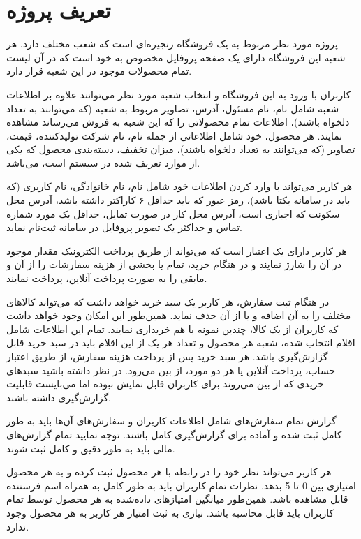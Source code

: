 \documentclass[12pt,a4paper]{article}
\begin{document}
\section{تعریف پروژه}
پروژه مورد نظر مربوط به یک فروشگاه زنجیره‌ای است که شعب مختلف دارد.
هر شعبه این فروشگاه دارای یک صفحه پروفایل مخصوص به خود است که در آن لیست تمام محصولات موجود در این شعبه قرار دارد. 
\par
کاربران با ورود به این فروشگاه و انتخاب شعبه مورد نظر می‌توانند
علاوه بر اطلاعات شعبه شامل نام، نام مسئول، آدرس، تصاویر مربوط به شعبه (که می‌توانند به تعداد دلخواه باشند)،
اطلاعات تمام محصولاتی را که این شعبه به فروش می‌رساند مشاهده نمایند.
هر محصول، خود شامل اطلاعاتی از جمله نام، نام شرکت تولیدکننده، قیمت، تصاویر (که می‌توانند به تعداد دلخواه باشند)،
میزان تخفیف، دسته‌بندی محصول که یکی از موارد تعریف شده در سیستم است، می‌باشد.
\par
هر کاربر می‌تواند با وارد کردن اطلاعات خود شامل نام،‌ نام خانوادگی، نام کاربری (که باید در سامانه یکتا باشد)،
رمز عبور که باید حداقل ۶ کاراکتر داشته باشد، آدرس محل سکونت که اجباری است،
آدرس محل کار در صورت تمایل، حداقل یک مورد شماره تماس و حداکثر یک تصویر پروفایل در سامانه ثبت‌نام نماید. 
\par
هر کاربر دارای یک اعتبار است که می‌تواند از طریق پرداخت الکترونیک مقدار موجود در آن را شارژ نمایند
و در هنگام خرید، تمام یا بخشی از هزینه سفارشات را از آن و مابقی را به صورت پرداخت آنلاین، پرداخت نمایند.
\par
در هنگام ثبت سفارش، هر کاربر یک سبد خرید خواهد داشت که می‌تواند کالاهای مختلف را به آن اضافه و یا از آن حذف نماید.
همین‌طور این امکان وجود خواهد داشت که کاربران از یک کالا، چندین نمونه با هم خریداری نمایند.
تمام این اطلاعات شامل اقلام انتخاب شده، شعبه هر محصول و تعداد هر یک از این اقلام باید در سبد خرید قابل گزارش‌گیری باشد.
هر سبد خرید پس از پرداخت هزینه سفارش، از طریق اعتبار حساب، پرداخت آنلاین یا هر دو مورد، از بین می‌رود.
در نظر داشته باشید سبد‌های خریدی که از بین می‌روند برای کاربران قابل نمایش نبوده اما می‌بایست قابلیت گزارش‌گیری داشته باشند.
\par
گزارش تمام سفارش‌های شامل اطلاعات کاربران و سفارش‌های آن‌ها باید به طور کامل ثبت شده و آماده برای گزارش‌گیری کامل باشند.
توجه نمایید تمام گزارش‌های مالی باید به طور دقیق و کامل ثبت شوند.
\par
هر کاربر می‌تواند نظر خود را در رابطه با هر محصول ثبت کرده و به هر محصول امتیازی بین 0 تا 5 بدهد.
نظرات تمام کاربران باید به طور کامل به همراه اسم فرستنده قابل مشاهده باشد.
همین‌طور میانگین امتیازهای داده‌شده به هر محصول توسط تمام کاربران باید قابل محاسبه باشد. نیازی به ثبت امتیاز هر کاربر به هر محصول وجود ندارد.
\end{document}
